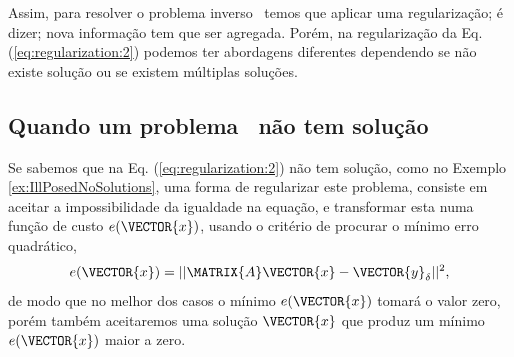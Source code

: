 Assim, para resolver o problema inverso \illposed~temos que aplicar uma regularização;
é dizer; nova informação tem que ser agregada.
Porém, na regularização da Eq. (\ref{eq:regularization:2}) podemos ter abordagens diferentes dependendo 
se não existe solução ou se existem múltiplas soluções. 
\subsection{Quando um problema \illposed~não tem solução}
Se sabemos que na Eq. (\ref{eq:regularization:2}) não tem solução, como no Exemplo \ref{ex:IllPosedNoSolutions}, 
uma forma de regularizar este problema, consiste em aceitar a impossibilidade da igualdade na equação, 
e transformar esta numa função de custo $e(\VECTOR{x})$, usando o critério de procurar o mínimo erro quadrático,
\begin{equation}\label{eq:regularization:3}
e(\VECTOR{x})=||\MATRIX{A}\VECTOR{x}-\VECTOR{y}_{\delta}||^2,
\end{equation}
de modo que no melhor dos casos o mínimo $e(\VECTOR{x})$ tomará o valor zero, 
porém também aceitaremos uma solução $\VECTOR{x}$ que produz um mínimo $e(\VECTOR{x})$  maior a zero.
